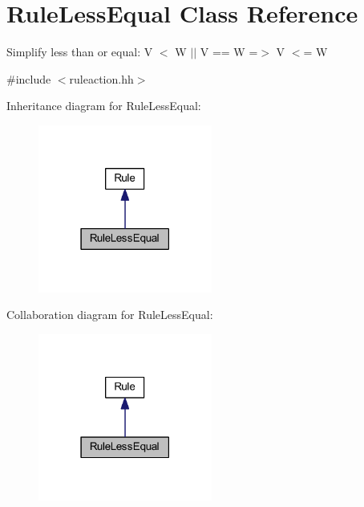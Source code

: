 \hypertarget{class_rule_less_equal}{}\section{Rule\+Less\+Equal Class Reference}
\label{class_rule_less_equal}


Simplify \textquotesingle{}less than or equal\textquotesingle{}\+: {\ttfamily V $<$ W $\vert$$\vert$ V == W =$>$ V $<$= W}  




{\ttfamily \#include $<$ruleaction.\+hh$>$}



Inheritance diagram for Rule\+Less\+Equal\+:
\nopagebreak
\begin{figure}[H]
\begin{center}
\leavevmode
\includegraphics[width=162pt]{class_rule_less_equal__inherit__graph}
\end{center}
\end{figure}


Collaboration diagram for Rule\+Less\+Equal\+:
\nopagebreak
\begin{figure}[H]
\begin{center}
\leavevmode
\includegraphics[width=162pt]{class_rule_less_equal__coll__graph}
\end{center}
\end{figure}
